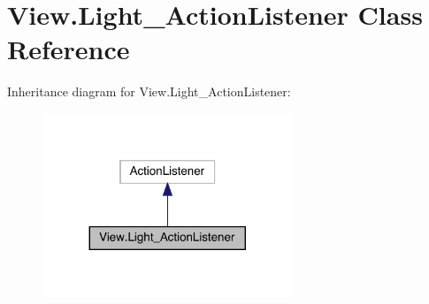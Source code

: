 \hypertarget{class_view_1_1_light___action_listener}{}\section{View.\+Light\+\_\+\+Action\+Listener Class Reference}
\label{class_view_1_1_light___action_listener}


Inheritance diagram for View.\+Light\+\_\+\+Action\+Listener\+:
\nopagebreak
\begin{figure}[H]
\begin{center}
\leavevmode
\includegraphics[width=212pt]{class_view_1_1_light___action_listener__inherit__graph}
\end{center}
\end{figure}


